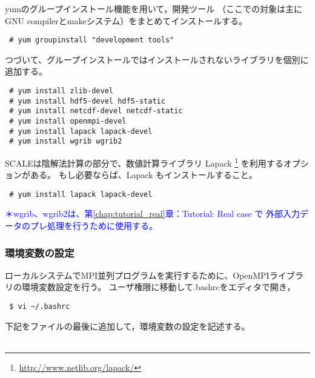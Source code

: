 
\noindent yumのグループインストール機能を用いて，開発ツール
（ここでの対象は主にGNU compilerとmakeシステム）をまとめてインストールする。
\begin{verbatim}
 # yum groupinstall "development tools"
\end{verbatim}

\noindent つづいて、グループインストールではインストールされないライブラリを個別に追加する。
\begin{verbatim}
 # yum install zlib-devel
 # yum install hdf5-devel hdf5-static
 # yum install netcdf-devel netcdf-static
 # yum install openmpi-devel
 # yum install lapack lapack-devel
 # yum install wgrib wgrib2
\end{verbatim}

SCALEは陰解法計算の部分で、数値計算ライブラリ Lapack
\footnote{\url{http://www.netlib.org/lapack/}}
を利用するオプションがある。
もし必要ならば、Lapack もインストールすること。
\begin{verbatim}
 # yum install lapack lapack-devel
\end{verbatim}

\noindent \textcolor{blue}{\small ＊wgrib、wgrib2は、第\ref{chap:tutorial_real}章：Tutorial: Real case で
外部入力データのプレ処理を行うために使用する。}



\subsubsection{環境変数の設定}

ローカルシステムでMPI並列プログラムを実行するために、OpenMPIライブラリの環境変数設定を行う。
ユーザ権限に移動して.bashrcをエディタで開き，
\begin{verbatim}
 $ vi ~/.bashrc
\end{verbatim}
下記をファイルの最後に追加して，環境変数の設定を記述する。\\

\\

